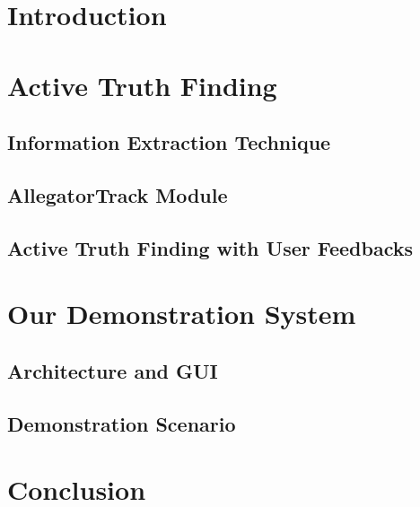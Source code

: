 \documentclass{sig-alternate}
\begin{document}
\section{Introduction}

\section{Active Truth Finding}

\subsection{Information Extraction Technique}

\subsection{AllegatorTrack Module}

\subsection{Active Truth Finding with User Feedbacks}

\section{Our Demonstration System}

\subsection{Architecture and GUI}

\subsection{Demonstration Scenario}

\section{Conclusion}



\end{document}
